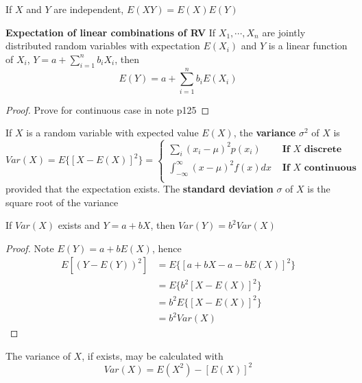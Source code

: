 \documentclass[11pt]{article}
\begin{document}
\begin{corollary*}
  If $X$ and $Y$ are independent, $E(XY) = E(X)E(Y)$
\end{corollary*}

\begin{theorem*}
  \textbf{Expectation of linear combinations of RV} If $X_1, \cdots, X_n$ are jointly distributed random variables with expectation $E(X_i)$ and $Y$ is a linear function of $X_i$, $Y=a+\sum_{i=1}^{n} b_i X_i$, then
  \[
    E(Y) = a + \sum_{i=1}^{n} b_i E(X_i)
  \]
  \begin{proof}
    Prove for continuous case in note p125
  \end{proof}
\end{theorem*}

\begin{defn*}
  If $X$ is a random variable with expected value $E(X)$, the \textbf{variance} $\sigma^2$ of $X$ is
  \[
    Var(X) = E\{ [X - E(X)]^2\} =
    \begin{cases*}
      \sum_{i} (x_i - \mu)^2 p(x_i) & \textbf{ If $X$ discrete }\\
      \int_{-\infty}^{\infty}(x-\mu)^2 f(x) dx & \textbf{ If $X$ continuous }\\
    \end{cases*}
  \]
  provided that the expectation exists. The \textbf{standard deviation} $\sigma$ of $X$ is the square root of the variance
\end{defn*}


\begin{theorem*}
  If $Var(X)$ exists and $Y = a+bX$, then $Var(Y) = b^2 Var(X)$
  \begin{proof}
    Note $E(Y) = a + bE(X)$, hence
    \begin{align*}
      E[(Y-E(Y))^2] &= E\{ [a+bX - a -bE(X)]^2\} \\
      &= E\{ b^2[X - E(X)]^2\}\\
      &= b^2 E\{ [X - E(X)]^2\}\\
      &= b^2 Var(X)
    \end{align*}
  \end{proof}
\end{theorem*}

\begin{theorem*}
  The variance of $X$, if exists, may be calculated with
  \[
    Var(X) = E(X^2) - [E(X)]^2
  \]
\end{theorem*}
\end{document}
